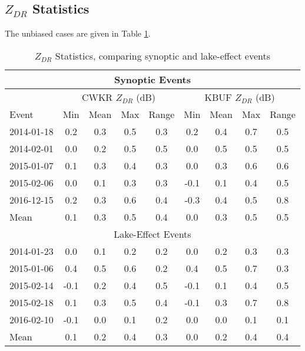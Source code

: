 \subsection{$Z_{DR}$ Statistics}
The unbiased cases are given in Table \ref{eventcompare}.
\begin{table}[h]
    \caption{$Z_{DR}$ Statistics, comparing synoptic and lake-effect events}\label{eventcompare}
    \begin{center}
    \begin{tabular}{|l|c|c|c|c|c|c|c|c|}
    \hline 
    \multicolumn{9}{|c|}{Synoptic Events} \\
    \hline
     &
    \multicolumn{4}{|c|}{CWKR $Z_{DR}$ (dB)} &
    \multicolumn{4}{|c|}{KBUF $Z_{DR}$ (dB)} \\
    \hline
     Event & Min & Mean & Max & Range & Min & Mean & Max & Range\\
    \hline\hline
    2014-01-18 & 0.2 & 0.3 & 0.5 & 0.3 & 0.2 & 0.4 & 0.7 & 0.5 \\
    \hline
    2014-02-01 & 0.0 & 0.2 & 0.5 & 0.5  & 0.0 & 0.5 & 0.5 & 0.5 \\    
    \hline
    2015-01-07 & 0.1 & 0.3 & 0.4 & 0.3 & 0.0 & 0.3 & 0.6 & 0.6 \\ 
    \hline
    2015-02-06 & 0.0 & 0.1 & 0.3 & 0.3 & -0.1 & 0.1 & 0.4 & 0.5\\
    \hline
    2016-12-15 & 0.2 & 0.3 & 0.6 & 0.4 & -0.3 & 0.4 & 0.5 & 0.8  \\ 
    \hline 
    Mean  & 0.1 & 0.3 & 0.5 & 0.4 & 0.0 & 0.3 & 0.5 & 0.5 \\
    \hline
    \multicolumn{9}{|c|}{Lake-Effect Events} \\
    \hline\hline
    2014-01-23 & 0.0 & 0.1 & 0.2 & 0.2 & 0.0 & 0.2 &0.3 & 0.3\\
    \hline
    2015-01-06  & 0.4 & 0.5 & 0.6  & 0.2 & 0.4 & 0.5 & 0.7 & 0.3 \\
    \hline
    2015-02-14 & -0.1 & 0.2 & 0.4  & 0.5 & -0.1 & 0.1 & 0.4 & 0.5 \\
    \hline
    2015-02-18 & 0.1  & 0.3 & 0.5 & 0.4  & -0.1 & 0.3 & 0.7 & 0.8 \\ 
    \hline
    2016-02-10  & -0.1 & 0.0 & 0.1 & 0.2 &  0.0 & 0.0 & 0.1 & 0.1  \\ 
    \hline\hline
    Mean & 0.1 & 0.2 & 0.4 & 0.3 & 0.0 & 0.2 & 0.4 & 0.4  \\
    \hline
    \end{tabular}
    \end{center}
\end{table}
